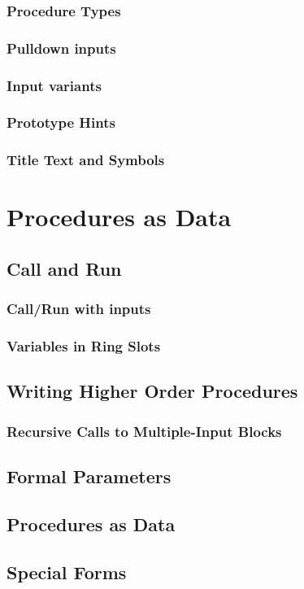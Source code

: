 \documentclass{report}
\begin{document}
\subsection{Procedure Types}
\subsection{Pulldown inputs}
\subsection{Input variants}
\subsection{Prototype Hints}
\subsection{Title Text and Symbols}
\chapter{Procedures as Data}
\section{Call and Run}
\subsection{Call/Run with inputs}
\subsection{Variables in Ring Slots}
\section{Writing Higher Order Procedures}
\subsection{Recursive Calls to Multiple-Input Blocks}
\section{Formal Parameters}
\section{Procedures as Data}
\section{Special Forms}
\end{document}
